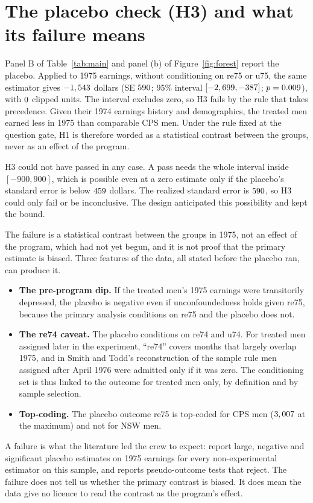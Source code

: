\documentclass[11pt]{article}
\newcommand{\ci}[2]{$[#1, #2]$}
\begin{document}
\section{The placebo check (H3) and what its failure means}
\label{sec:placebo}

Panel B of Table~\ref{tab:main} and panel (b) of Figure~\ref{fig:forest} report the placebo.
Applied to 1975 earnings, without conditioning on re75 or u75, the same estimator gives
$-1,543$ dollars (SE $590$; 95\% interval
\ci{\PlaceboCiLow}{\PlaceboCiHigh}; $p = 0.009$), with $0$ clipped units.
The interval excludes zero, so H3 fails by the rule that takes precedence. Given their 1974
earnings history and demographics, the treated men earned less in 1975 than comparable CPS
men. Under the rule fixed at the question gate, H1 is therefore worded as a statistical
contrast between the groups, never as an effect of the program.

H3 could not have passed in any case. A pass needs the whole interval inside $[-900, 900]$,
which is possible even at a zero estimate only if the placebo's standard error is below
$459$ dollars. The realized standard error is $590$, so H3 could only
fail or be inconclusive. The design anticipated this possibility and kept the bound.

The failure is a statistical contrast between the groups in 1975, not an effect of the
program, which had not yet begun, and it is not proof that the primary estimate is biased.
Three features of the data, all stated before the placebo ran, can produce it.
\begin{itemize}
  \setlength{\itemsep}{1pt}
  \item \textbf{The pre-program dip.} If the treated men's 1975 earnings were transitorily
        depressed, the placebo is
        negative even if unconfoundedness holds given re75, because the primary analysis
        conditions on re75 and the placebo does not.
  \item \textbf{The re74 caveat.} The placebo conditions on re74 and u74. For treated men
        assigned later in the experiment, ``re74'' covers months that largely overlap 1975,
        and in Smith and Todd's reconstruction of the sample rule \citep[Sec.~5]{smith2005}
        men assigned after April 1976 were admitted only if it was zero. The conditioning
        set is thus linked to the outcome for treated men only, by definition and by sample
        selection.
  \item \textbf{Top-coding.} The placebo outcome re75 is top-coded for CPS men
        ($3,007$ at the maximum) and not for NSW men.
\end{itemize}
A failure is what the literature led the crew to expect: \citet{imbens2025} report large,
negative and significant placebo estimates on 1975 earnings for every non-experimental
estimator on this sample, and \citet{imbens2015} reports pseudo-outcome tests that reject.
The failure does not tell us whether the primary contrast is biased. It does mean the data
give no licence to read the contrast as the program's effect.
\end{document}
